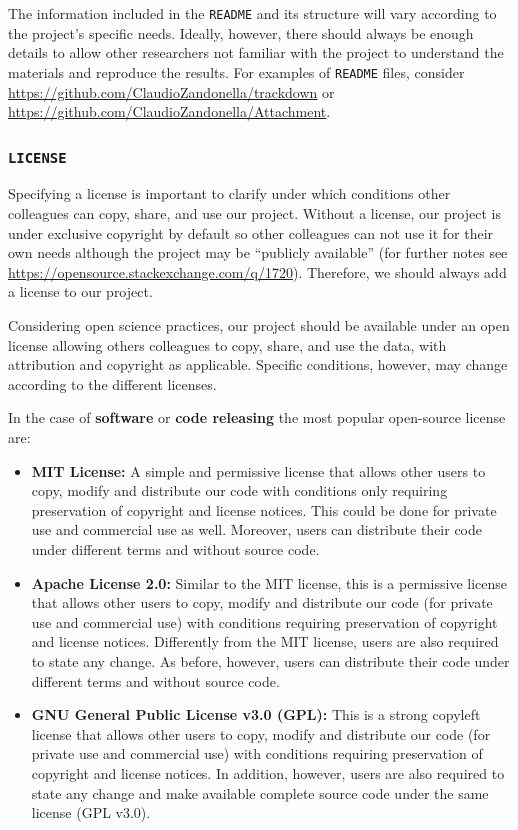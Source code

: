\documentclass[
  11pt,
]{book}
\begin{document}
The information included in the \texttt{README} and its structure will vary according to the project's specific needs. Ideally, however, there should always be enough details to allow other researchers not familiar with the project to understand the materials and reproduce the results. For examples of \texttt{README} files, consider \url{https://github.com/ClaudioZandonella/trackdown} or \url{https://github.com/ClaudioZandonella/Attachment}.

\hypertarget{license-section}{%
\subsubsection{\texorpdfstring{\texttt{LICENSE}}{LICENSE}}\label{license-section}}

Specifying a license is important to clarify under which conditions other colleagues can copy, share, and use our project. Without a license, our project is under exclusive copyright by default so other colleagues can not use it for their own needs although the project may be ``publicly available'' (for further notes see \url{https://opensource.stackexchange.com/q/1720}). Therefore, we should always add a license to our project.

Considering open science practices, our project should be available under an open license allowing others colleagues to copy, share, and use the data, with attribution and copyright as applicable. Specific conditions, however, may change according to the different licenses.

In the case of \textbf{software} or \textbf{code releasing} the most popular open-source license are:

\begin{itemize}
\item
  \textbf{MIT License:} A simple and permissive license that allows other users to copy, modify and distribute our code with conditions only requiring preservation of copyright and license notices. This could be done for private use and commercial use as well. Moreover, users can distribute their code under different terms and without source code.
\item
  \textbf{Apache License 2.0:} Similar to the MIT license, this is a permissive license that allows other users to copy, modify and distribute our code (for private use and commercial use) with conditions requiring preservation of copyright and license notices. Differently from the MIT license, users are also required to state any change. As before, however, users can distribute their code under different terms and without source code.
\item
  \textbf{GNU General Public License v3.0 (GPL):} This is a strong copyleft license that allows other users to copy, modify and distribute our code (for private use and commercial use) with conditions requiring preservation of copyright and license notices. In addition, however, users are also required to state any change and make available complete source code under the same license (GPL v3.0).
\end{itemize}
\end{document}
